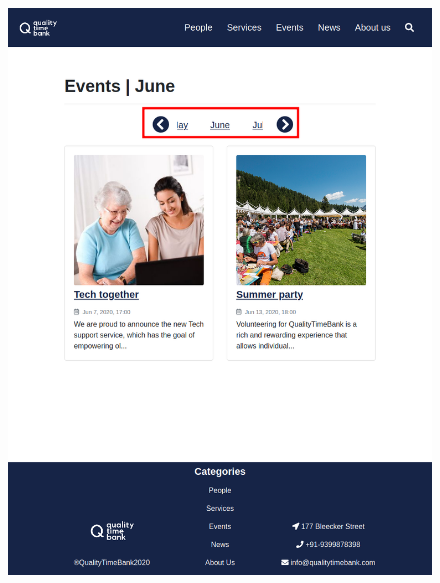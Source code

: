 \documentclass[a4paper, 11pt, parskip=half, headsepline]{scrreprt}
\begin{document}
\begin{figure}[H]
\begin{minipage}[t]{0.4\textwidth}
    	\includegraphics[width=0.9\linewidth, keepaspectratio]{scenarios/scenario-32}
    	\caption{}
    	\label{fig:scenario-32}
    \end{minipage}
\end{figure}
\vspace{-1.5em}
\end{document}
